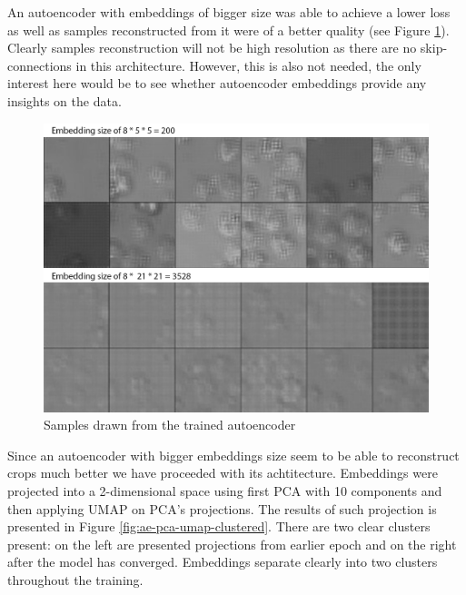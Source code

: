 An autoencoder with embeddings of bigger size was able to achieve a lower loss as well as samples reconstructed from it were of a better quality (see Figure \ref{fig:ae-samples}). Clearly samples reconstruction will not be high resolution as there are no skip-connections in this architecture. However, this is also not needed, the only interest here would be to see whether autoencoder embeddings provide any insights on the data.
\begin{figure}[H]
	\begin{center}
		\includegraphics[width=0.8\linewidth]{bilder/ae-embeddings/ae-samples.png}
		\caption{Samples drawn from the trained autoencoder}
		\label{fig:ae-samples}
	\end{center}
\end{figure}

Since an autoencoder with bigger embeddings size seem to be able to reconstruct crops much better we have proceeded with its achtitecture. Embeddings were projected into a 2-dimensional space using first PCA with 10 components and then applying UMAP on PCA's projections. The results of such projection is presented in Figure \ref{fig:ae-pca-umap-clustered}. There are two clear clusters present: on the left are presented projections from earlier epoch and on the right after the model has converged. Embeddings separate clearly into two clusters throughout the training.

